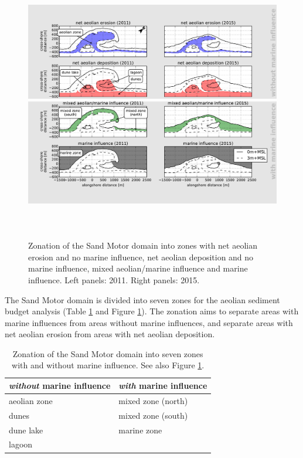 \begin{figure}
  \includegraphics[height=12cm, angle=90]{../Figures/decomposition}
  \caption{Zonation of the Sand Motor domain into zones with net
    aeolian erosion and no marine influence, net aeolian deposition
    and no marine influence, mixed aeolian/marine influence and marine
    influence. Left panels: 2011. Right panels: 2015.}
  \label{fig:decomposition}
\end{figure}

The Sand Motor domain is divided into seven zones for the aeolian
sediment budget analysis (Table \ref{tab:decomposition} and Figure
\ref{fig:decomposition}). The zonation aims to separate areas with
marine influences from areas without marine influences, and separate
areas with net aeolian erosion from areas with net aeolian deposition.

\begin{table}[h!]
  \centering
  \caption{Zonation of the Sand Motor domain into seven zones with and
    without marine influence. See also Figure \ref{fig:decomposition}.}
  \label{tab:decomposition}
  \begin{tabularx}{\textwidth}{XX}
    \emph{without} marine influence  & \emph{with} marine influence \\
    \hline
    aeolian zone                     & mixed zone (north)           \\
    dunes                            & mixed zone (south)           \\
    dune lake                        & marine zone                  \\
    lagoon                           &                              \\
  \end{tabularx}
\end{table}

